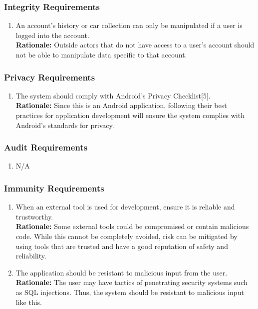 \documentclass[]{article}
\begin{document}
\subsubsection{Integrity Requirements}
\label{ssub:integrity_requirements}
\begin{enumerate}[label={SR-INT\arabic*.}]
    \item An account's history or car collection can only be manipulated if a user is logged into the account.\\
    \textbf{Rationale:} Outside actors that do not have access to a user's account should not be able to manipulate data specific to that account.
\end{enumerate}

\subsubsection{Privacy Requirements}
\label{ssub:privacy_requirements}
\begin{enumerate}[label={SR-P\arabic*.}]
    \item The system should comply with Android's Privacy Checklist[5].\\
    \textbf{Rationale:} Since this is an Android application, following their best practices for application development will ensure the system complies with Android's standards for privacy.
\end{enumerate}

\subsubsection{Audit Requirements}
\label{ssub:audit_requirements}
\begin{enumerate}[label={SR-AU\arabic*.}]
    \item N/A
\end{enumerate}

\subsubsection{Immunity Requirements}
\label{ssub:immunity_requirements}
\begin{enumerate}[label={SR-IM\arabic*.}]
    \item When an external tool is used for development, ensure it is reliable and trustworthy.\\
    \textbf{Rationale:} Some external tools could be compromised or contain malicious code. While this cannot be completely avoided, risk can be mitigated by using tools that are trusted and have a good reputation of safety and reliability.
    \item The application should be resistant to malicious input from the user.\\
    \textbf{Rationale:} The user may have tactics of penetrating security systems such as SQL injections. Thus, the system should be resistant to malicious input like this.
\end{enumerate}
\end{document}

